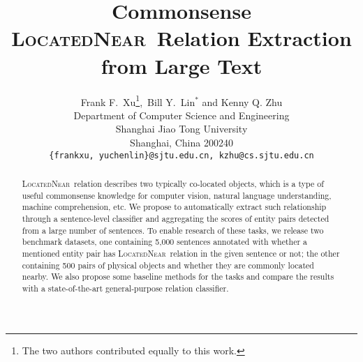 \documentclass{article}
\author{
	Frank F.~Xu\thanks{The two authors contributed equally to this work.},~Bill Y.~Lin$^*$ and Kenny Q. Zhu \\ [0.5ex]
	Department of Computer Science and Engineering\\[0.5ex]
	Shanghai Jiao Tong University\\[0.5ex]
	Shanghai, China 200240 \\[0.5ex]
	\texttt{\{frankxu, yuchenlin\}@sjtu.edu.cn, kzhu@cs.sjtu.edu.cn}
}
\newcommand{\lnear}{\textsc{LocatedNear}}
\begin{document}
\title{Commonsense \lnear~Relation Extraction from Large Text}

\maketitle

\begin{abstract}
\lnear~relation describes two typically co-located objects, 
which is a type of useful commonsense knowledge for 
computer vision, natural language understanding, machine comprehension, etc. 
We propose to automatically extract such relationship through
a sentence-level classifier and aggregating the scores of
entity pairs detected from a large number of sentences.
To enable research of these tasks, we release two benchmark datasets, 
one containing 5,000 sentences annotated with whether a mentioned entity pair has \lnear~relation in the given sentence or not; 
the other containing 500 pairs of physical objects and whether they are 
commonly located nearby.
We also propose some baseline methods for the tasks and compare the results with a state-of-the-art general-purpose relation classifier.
\end{abstract}
















\end{document}

